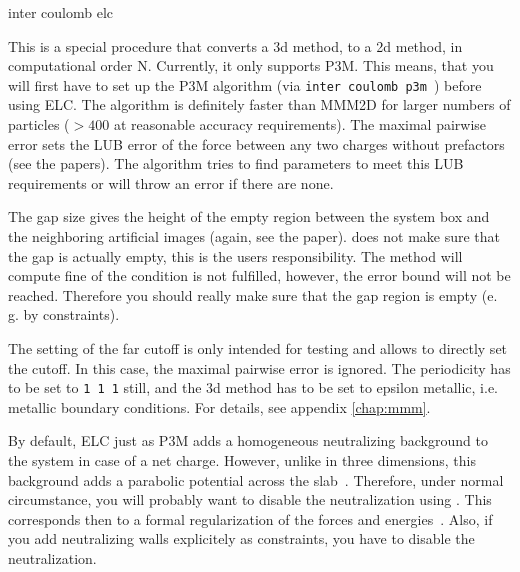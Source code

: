 \begin{essyntax}
  inter coulomb elc  
  \begin{features}
  \end{features}
\end{essyntax}
This is a special procedure that converts a 3d method, to a 2d method,
in computational order N. Currently, it only supports P3M. This means,
that you will first have to set up the P3M algorithm (via
\texttt{inter coulomb p3m }) before using ELC.  The
algorithm is definitely faster than MMM2D for larger numbers of
particles ($>400$ at reasonable accuracy requirements). The maximal
pairwise error  sets the LUB error of
the force between any two charges without prefactors (see the
papers). The algorithm tries to find parameters to meet this LUB
requirements or will throw an error if there are none.

The gap size  gives the height of the empty region
between the system box and the neighboring artificial images (again,
see the paper).  \es does not make sure that the gap is actually
empty, this is the users responsibility. The method will compute fine
of the condition is not fulfilled, however, the error bound will not
be reached. Therefore you should really make sure that the gap region
is empty (e. g. by constraints).

The setting of the far cutoff  is only intended for
testing and allows to directly set the cutoff. In this case, the
maximal pairwise error is ignored. The periodicity has to be set to
\texttt{1 1 1} still, and the 3d method has to be set to epsilon
metallic, i.e.  metallic boundary conditions. For details, see
appendix \vref{chap:mmm}.

By default, ELC just as P3M adds a homogeneous neutralizing background
to the system in case of a net charge. However, unlike in three
dimensions, this background adds a parabolic potential across the
slab~\cite{ballenegger09a}. Therefore, under normal circumstance, you
will probably want to disable the neutralization using
. This corresponds then to a formal
regularization of the forces and energies~\cite{ballenegger09a}. Also,
if you add neutralizing walls explicitely as constraints, you have to
disable the neutralization.

